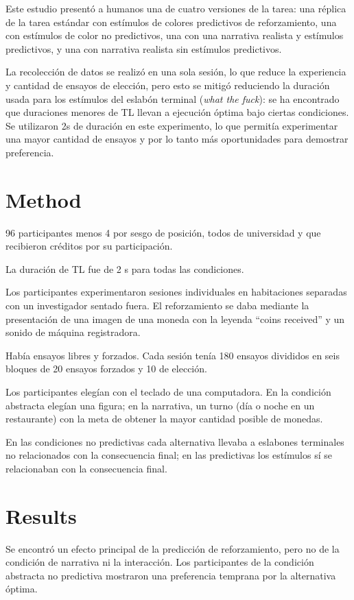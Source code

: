 \documentclass[a4paper,12pt]{article}
\begin{document}
Este estudio presentó a humanos una de cuatro versiones de la tarea: una réplica de la tarea estándar con estímulos de colores predictivos de reforzamiento, una con estímulos de color no predictivos, una con una narrativa realista y estímulos predictivos, y una con narrativa realista sin estímulos predictivos.

La recolección de datos se realizó en una sola sesión, lo que reduce la experiencia y cantidad de ensayos de elección, pero esto se mitigó reduciendo la duración usada para los estímulos del eslabón terminal ({\itshape what the fuck}): se ha encontrado que duraciones menores de TL llevan a ejecución óptima bajo ciertas condiciones.
Se utilizaron 2s de duración en este experimento, lo que permitía experimentar una mayor cantidad de ensayos y por lo tanto más oportunidades para demostrar preferencia.

\section{Method}

96 participantes menos 4 por sesgo de posición, todos de universidad y que recibieron créditos por su participación.

La duración de TL fue de 2 s para todas las condiciones.

Los participantes experimentaron sesiones individuales en habitaciones separadas con un investigador sentado fuera.
El reforzamiento se daba mediante la presentación de una imagen de una moneda con la leyenda ``coins received'' y un sonido de máquina registradora.

Había ensayos libres y forzados.
Cada sesión tenía 180 ensayos divididos en seis bloques de 20 ensayos forzados y 10 de elección.

Los participantes elegían con el teclado de una computadora.
En la condición abstracta elegían una figura; en la narrativa, un turno (día o noche en un restaurante) con la meta de obtener la mayor cantidad posible de monedas.

En las condiciones no predictivas cada alternativa llevaba a eslabones terminales no relacionados con la consecuencia final; en las predictivas los estímulos sí se relacionaban con la consecuencia final.

\section{Results}

Se encontró un efecto principal de la predicción de reforzamiento, pero no de la condición de narrativa ni la interacción.
Los participantes de la condición abstracta no predictiva mostraron una preferencia temprana por la alternativa óptima.
\end{document}
